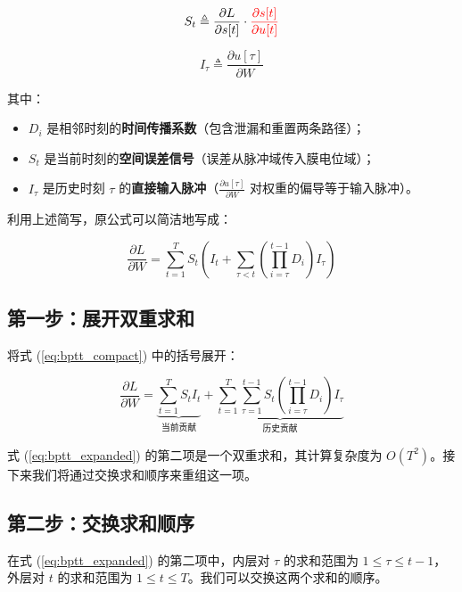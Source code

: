 \documentclass[journal,12pt,onecolumn]{IEEEtran}
\begin{document}
\begin{equation}
S_t \triangleq \frac{\partial L}{\partial s[t]} \cdot {\color{red}{\frac{\partial s[t]}{\partial u[t]}}}
\end{equation}

\begin{equation}
I_\tau \triangleq \frac{\partial u[\tau]}{\partial W}
\end{equation}

其中：
\begin{itemize}
    \item \(D_i\) 是相邻时刻的\textbf{时间传播系数}（包含泄漏和重置两条路径）；
    \item \(S_t\) 是当前时刻的\textbf{空间误差信号}（误差从脉冲域传入膜电位域）；
    \item \(I_\tau\) 是历史时刻 \(\tau\) 的\textbf{直接输入脉冲}（\(\frac{\partial u[\tau]}{\partial W}\) 对权重的偏导等于输入脉冲）。
\end{itemize}

利用上述简写，原公式可以简洁地写成：

\begin{equation}
\boxed{
\frac{\partial L}{\partial W} = \sum_{t=1}^T S_t \left( I_t + \sum_{\tau < t} \left( \prod_{i=\tau}^{t-1} D_i \right) I_\tau \right)
}
\label{eq:bptt_compact}
\end{equation}

\subsection{第一步：展开双重求和}

将式 (\ref{eq:bptt_compact}) 中的括号展开：

\begin{equation}
\frac{\partial L}{\partial W} = \underbrace{\sum_{t=1}^T S_t I_t}_{\text{当前贡献}} + \underbrace{\sum_{t=1}^T \sum_{\tau=1}^{t-1} S_t \left( \prod_{i=\tau}^{t-1} D_i \right) I_\tau}_{\text{历史贡献}}
\label{eq:bptt_expanded}
\end{equation}

式 (\ref{eq:bptt_expanded}) 的第二项是一个双重求和，其计算复杂度为 \(O(T^2)\)。接下来我们将通过交换求和顺序来重组这一项。

\subsection{第二步：交换求和顺序}

在式 (\ref{eq:bptt_expanded}) 的第二项中，内层对 \(\tau\) 的求和范围为 \(1 \le \tau \le t-1\)，外层对 \(t\) 的求和范围为 \(1 \le t \le T\)。我们可以交换这两个求和的顺序。
\end{document}
